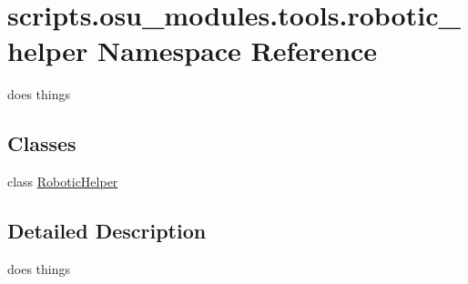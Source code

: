 \hypertarget{namespacescripts_1_1osu__modules_1_1tools_1_1robotic__helper}{}\section{scripts.\+osu\+\_\+modules.\+tools.\+robotic\+\_\+helper Namespace Reference}
\label{namespacescripts_1_1osu__modules_1_1tools_1_1robotic__helper}


does things  


\subsection*{Classes}
\begin{DoxyCompactItemize}
\item 
class \hyperlink{classscripts_1_1osu__modules_1_1tools_1_1robotic__helper_1_1RoboticHelper}{Robotic\+Helper}
\end{DoxyCompactItemize}


\subsection{Detailed Description}
does things 